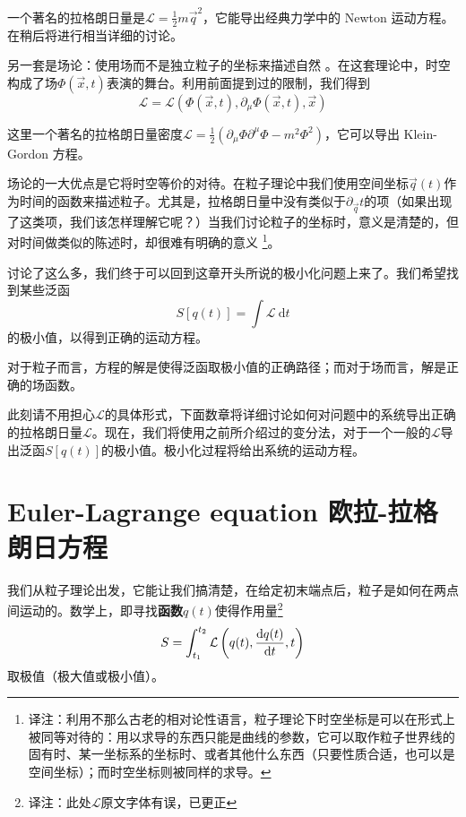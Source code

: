 一个著名的拉格朗日量是\({\mathcal L} = \frac{1}{2}m\vec{q}^2\)，它能导出经典力学中的 Newton 运动方程。在稍后将进行相当详细的讨论。

另一套是场论：使用场而不是独立粒子的坐标来描述自然%
%
。在这套理论中，时空构成了场\(\Phi(\vec{x},t)\)表演的舞台。利用前面提到过的限制，我们得到%
\begin{equation}
{\mathscr L} = {\mathscr L} (\Phi(\vec{x},t), \partial_\mu \Phi(\vec{x},t), \vec{x})
\end{equation}

这里一个著名的拉格朗日量密度\({\mathscr L} = \frac{1}{2}\left(\partial_\mu\Phi\partial^\mu\Phi-m^2\Phi^2\right)\)，它可以导出 Klein-Gordon 方程。

场论的一大优点是它将时空等价的对待。在粒子理论中我们使用空间坐标\(\vec{q}(t)\)作为时间的函数来描述粒子。尤其是，拉格朗日量中没有类似于\(\partial_{\vec{q}}t\)的项（如果出现了这类项，我们该怎样理解它呢？）当我们讨论粒子的坐标时，意义是清楚的，但对时间做类似的陈述时，却很难有明确的意义%
\footnote{译注：利用不那么古老的相对论性语言，粒子理论下时空坐标是可以在形式上被同等对待的：用以求导的东西只能是曲线的参数，它可以取作粒子世界线的固有时、某一坐标系的坐标时、或者其他什么东西（只要性质合适，也可以是空间坐标）；而时空坐标则被同样的求导。}。

讨论了这么多，我们终于可以回到这章开头所说的极小化问题上来了。我们希望找到某些泛函
\[
S[q(t)] = \int {\mathcal L}~{\mathrm d}t
\]
的极小值，以得到正确的运动方程。

对于粒子而言，方程的解是使得泛函取极小值的正确路径；而对于场而言，解是正确的场函数。

此刻请不用担心\(\mathcal L\)的具体形式，下面数章将详细讨论如何对问题中的系统导出正确的拉格朗日量\({\mathcal L}\)。现在，我们将使用之前所介绍过的变分法，对于一个一般的\(\mathcal L\)导出泛函\(S[q(t)]\)的极小值。极小化过程将给出系统的运动方程。

\section[欧拉-拉格朗日方程]{Euler-Lagrange equation \quad 欧拉-拉格朗日方程}\label{sec4.4}
我们从粒子理论出发，它能让我们搞清楚，在给定初末端点后，粒子是如何在两点间运动的。数学上，即寻找{\bf 函数}\(q(t)\)使得作用量\footnote{译注：此处${\mathcal L}$原文字体有误，已更正}
\[
S = \int_{t_1}^{t_2} {\mathcal L}\left(q(t),\frac{\mathrm d q(t)}{\mathrm d t},t\right)
\]
取极值（极大值或极小值）。


